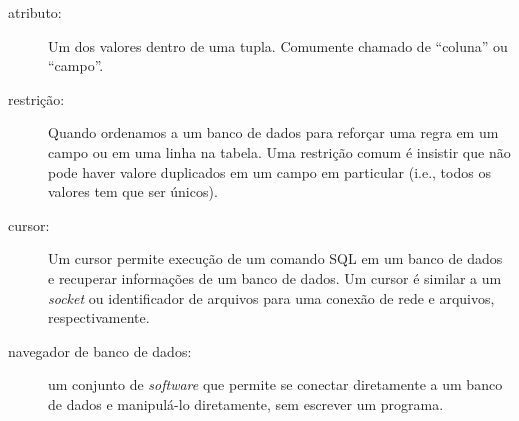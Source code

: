\begin{description}



\item[atributo:] Um dos valores dentro de uma tupla. Comumente chamado de
  ``coluna'' ou ``campo''.
  
  
\item[restrição:] Quando ordenamos a um banco de dados para reforçar uma regra
em um campo ou em uma linha na tabela. Uma restrição comum é insistir que não
pode haver valore duplicados em um campo em particular (i.e., todos os
valores tem que ser únicos).



\item[cursor:] Um cursor permite execução de um comando SQL em um banco de
  dados e recuperar informações de um banco de dados. Um cursor é similar a
  um {\it socket} ou identificador de arquivos para uma conexão de rede e
  arquivos, respectivamente.
  

\item[navegador de banco de dados:] um conjunto de {\it software} que permite
  se conectar diretamente a um banco de dados e manipulá-lo diretamente, sem
  escrever um programa.
  


\end{description}
